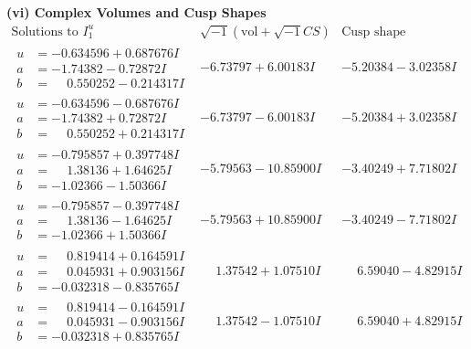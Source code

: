 \documentclass[1p]{elsarticle_modified}
\theoremstyle{definition}
\newcommand{\I}{\sqrt{-1}}
\begin{document}
\newpage\flushleft \textbf{(vi) Complex Volumes and Cusp Shapes}
$$\begin{array}{c|c|c}  
\text{Solutions to }I^u_{1}& \I (\text{vol} + \sqrt{-1}CS) & \text{Cusp shape}\\
 \hline 
\begin{aligned}
u &= -0.634596 + 0.687676 I \\
a &= -1.74382 - 0.72872 I \\
b &= \phantom{-}0.550252 - 0.214317 I\end{aligned}
 & -6.73797 + 6.00183 I & -5.20384 - 3.02358 I \\ \hline\begin{aligned}
u &= -0.634596 - 0.687676 I \\
a &= -1.74382 + 0.72872 I \\
b &= \phantom{-}0.550252 + 0.214317 I\end{aligned}
 & -6.73797 - 6.00183 I & -5.20384 + 3.02358 I \\ \hline\begin{aligned}
u &= -0.795857 + 0.397748 I \\
a &= \phantom{-}1.38136 + 1.64625 I \\
b &= -1.02366 - 1.50366 I\end{aligned}
 & -5.79563 - 10.85900 I & -3.40249 + 7.71802 I \\ \hline\begin{aligned}
u &= -0.795857 - 0.397748 I \\
a &= \phantom{-}1.38136 - 1.64625 I \\
b &= -1.02366 + 1.50366 I\end{aligned}
 & -5.79563 + 10.85900 I & -3.40249 - 7.71802 I \\ \hline\begin{aligned}
u &= \phantom{-}0.819414 + 0.164591 I \\
a &= \phantom{-}0.045931 + 0.903156 I \\
b &= -0.032318 - 0.835765 I\end{aligned}
 & \phantom{-}1.37542 + 1.07510 I & \phantom{-}6.59040 - 4.82915 I \\ \hline\begin{aligned}
u &= \phantom{-}0.819414 - 0.164591 I \\
a &= \phantom{-}0.045931 - 0.903156 I \\
b &= -0.032318 + 0.835765 I\end{aligned}
 & \phantom{-}1.37542 - 1.07510 I & \phantom{-}6.59040 + 4.82915 I \\ \hline\begin{aligned}

\end{aligned}
\end{array}$$
\end{document}
